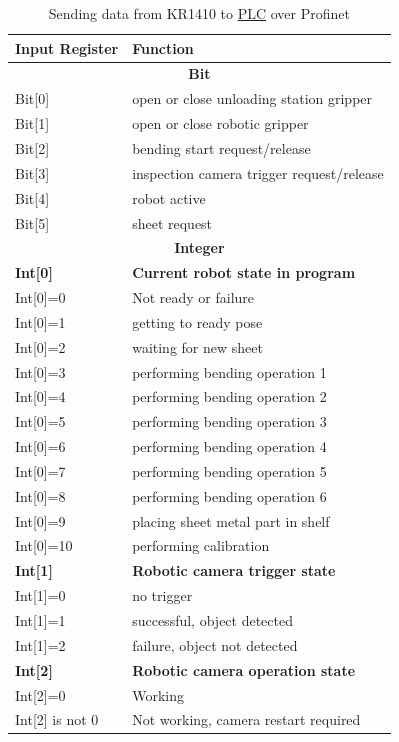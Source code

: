 \begin{table}[h]
  \centering
  \small
  \renewcommand{\arraystretch}{1.2} %
  \begin{tabular}{l@{\hskip 2cm}l}
    \hline
      \textbf{Input Register} & \textbf{Function} \\ \hline
      \multicolumn{2}{c}{\textbf{Bit}} \\ \hline
      Bit[0] & open or close unloading station gripper \\
      Bit[1] & open or close robotic gripper\\
      Bit[2] & bending start request/release\\
      Bit[3] & inspection camera trigger request/release\\
      Bit[4] & robot active\\
      Bit[5] & sheet request\\\hline
      \multicolumn{2}{c}{\textbf{Integer}} \\ \hline
      \textbf{Int[0]} & \textbf{Current robot state in program}\\
      Int[0]=0 & Not ready or failure\\
      Int[0]=1 & getting to ready pose\\
      Int[0]=2 & waiting for new sheet\\
      Int[0]=3 & performing bending operation 1\\
      Int[0]=4 & performing bending operation 2\\
      Int[0]=5 & performing bending operation 3\\
      Int[0]=6 & performing bending operation 4\\
      Int[0]=7 & performing bending operation 5\\
      Int[0]=8 & performing bending operation 6\\
      Int[0]=9 & placing sheet metal part in shelf\\
      Int[0]=10 & performing calibration\\
      \textbf{Int[1]} & \textbf{Robotic camera trigger state}\\
      Int[1]=0 & no trigger\\
      Int[1]=1 & successful, object detected\\
      Int[1]=2 & failure, object not detected\\
      \textbf{Int[2]} & \textbf{Robotic camera operation state}\\
      Int[2]=0 & Working\\
      Int[2] is not 0 & Not working, camera restart required\\
      \hline
  \end{tabular}
  \caption{Sending data from KR1410 to \hyperref[acro:PLC]{PLC} over Profinet}
  \label{tab:kr1410-to-plc}
\end{table}

